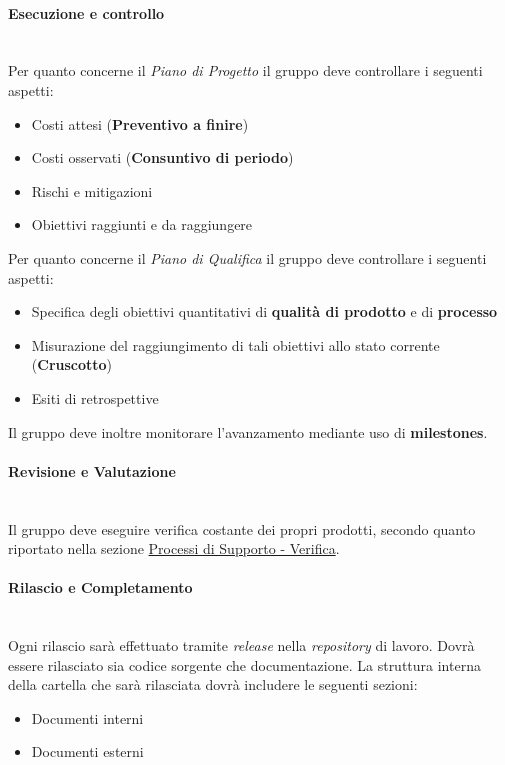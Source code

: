 \paragraph{Esecuzione e controllo}
\mbox{} \\
Per quanto concerne il \textit{Piano di Progetto} il gruppo deve controllare i seguenti aspetti:
\begin{itemize}
    \item Costi attesi (\textbf{Preventivo a finire})
    \item Costi osservati (\textbf{Consuntivo di periodo})
    \item Rischi e mitigazioni
    \item Obiettivi raggiunti e da raggiungere
\end{itemize}
Per quanto concerne il \textit{Piano di Qualifica} il gruppo deve controllare i seguenti aspetti:
\begin{itemize}
    \item Specifica degli obiettivi quantitativi di \textbf{qualità di prodotto} e di \textbf{processo}
    \item Misurazione del raggiungimento di tali obiettivi allo stato corrente (\textbf{Cruscotto})
    \item Esiti di retrospettive
\end{itemize}

Il gruppo deve inoltre monitorare l'avanzamento mediante uso di \textbf{milestones}.

\paragraph{Revisione e Valutazione}
\mbox{} \\
Il gruppo deve eseguire verifica costante dei propri prodotti, secondo quanto riportato nella sezione \hyperref[sec:Verifica]{Processi di Supporto - Verifica}.

\paragraph{Rilascio e Completamento}
\mbox{} \\
Ogni rilascio sarà effettuato tramite \textit{release} nella \textit{repository} di lavoro.
Dovrà essere rilasciato sia codice sorgente che documentazione.
La struttura interna della cartella che sarà rilasciata dovrà includere le seguenti sezioni:
\begin{itemize}
    \item Documenti interni 
    \item Documenti esterni
\end{itemize}

